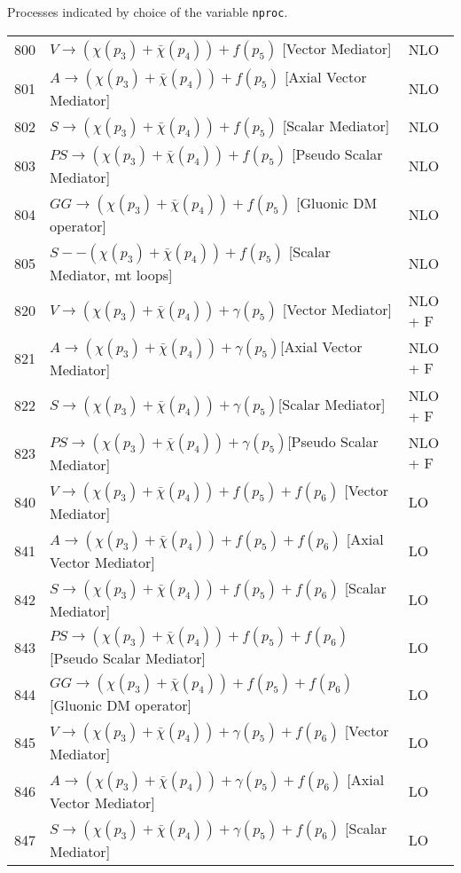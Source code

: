 \documentclass{article}
\begin{document}
{{{{{{\begin{table}
\begin{center}
\caption{Processes indicated by choice of the variable {\tt nproc}.}
\end{center}
\end{table}
\newpage
\begin{table}
\begin{center}
\begin{tabular}{|l|l|l|}
\hline
800 & $ V\to({\chi}(p_3)+\bar{\chi}(p_4)) +f(p_5) $ [Vector Mediator] & NLO \\
801 & $ A\to({\chi}(p_3)+\bar{\chi}(p_4)) +f(p_5)$ [Axial Vector Mediator] & NLO \\
802 & $ S\to({\chi}(p_3)+\bar{\chi}(p_4)) +f(p_5)$ [Scalar Mediator] & NLO \\
803 &  $ PS\to({\chi}(p_3)+\bar{\chi}(p_4)) +f(p_5)$ [Pseudo Scalar Mediator] & NLO \\
804 &  $ GG\to({\chi}(p_3)+\bar{\chi}(p_4)) +f(p_5)$ [Gluonic DM operator]  & NLO \\
805 & $ S--({\chi}(p_3)+\bar{\chi}(p_4)) +f(p_5)$ [Scalar Mediator, mt loops] & NLO \\
\hline
820 & $V\to({\chi}(p_3)+\bar{\chi}(p_4)) +\gamma(p_5)$ [Vector Mediator] & NLO + F \\
821 & $A\to({\chi}(p_3)+\bar{\chi}(p_4)) +\gamma(p_5) $[Axial Vector Mediator] & NLO + F \\
822 & $ S\to({\chi}(p_3)+\bar{\chi}(p_4)) +\gamma(p_5) $[Scalar Mediator] & NLO + F \\
823 &$ PS\to({\chi}(p_3)+\bar{\chi}(p_4)) +\gamma(p_5) $[Pseudo Scalar Mediator] & NLO + F \\
\hline
840 &$ V\to({\chi}(p_3)+\bar{\chi}(p_4)) +f(p_5)+f(p_6)$ [Vector Mediator] & LO\\
841 &$A\to({\chi}(p_3)+\bar{\chi}(p_4)) +f(p_5)+f(p_6)$ [Axial Vector Mediator]  & LO\\
842 &$ S\to({\chi}(p_3)+\bar{\chi}(p_4)) +f(p_5)+f(p_6)$ [Scalar Mediator]  & LO\\
843 &$ PS\to({\chi}(p_3)+\bar{\chi}(p_4)) +f(p_5)+f(p_6)$ [Pseudo Scalar Mediator]  & LO\\
844 &$ GG\to({\chi}(p_3)+\bar{\chi}(p_4)) +f(p_5)+f(p_6)$ [Gluonic DM operator]  & LO\\
\hline
845 & $V\to({\chi}(p_3)+\bar{\chi}(p_4)) +\gamma(p_5)+f(p_6)$ [Vector Mediator]  & LO\\
846 & $A\to({\chi}(p_3)+\bar{\chi}(p_4)) +\gamma(p_5)+f(p_6)$ [Axial Vector Mediator]  & LO\\
847 & $S\to({\chi}(p_3)+\bar{\chi}(p_4)) +\gamma(p_5)+f(p_6)$ [Scalar Mediator]  & LO\\

\end{tabular}
\end{center}
\end{table}}}}}}}
\end{document}

